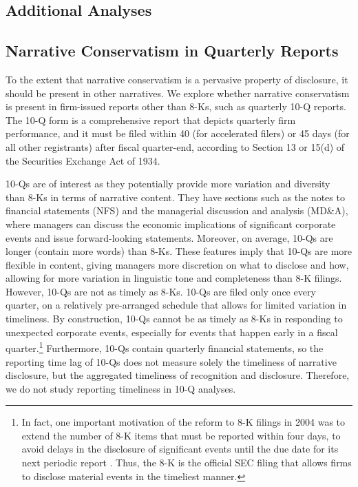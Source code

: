 \documentclass[letterpaper,12pt]{article}
\begin{document}
\begin{spacing}{1.5}
\section{Additional Analyses}
\subsection{Narrative Conservatism in Quarterly Reports}
\noindent To the extent that narrative conservatism is a pervasive property of disclosure, it should be present in other narratives. We explore whether narrative conservatism is present in firm-issued reports other than 8-Ks, such as quarterly 10-Q reports. The 10-Q form is a comprehensive report that depicts quarterly firm performance, and it must be filed within 40 (for accelerated filers) or 45 days (for all other registrants) after fiscal quarter-end, according to Section 13 or 15(d) of the Securities Exchange Act of 1934.

10-Qs are of interest as they potentially provide more variation and diversity than 8-Ks in terms of narrative content. They have sections such as the notes to financial statements (NFS) and the managerial discussion and analysis (MD\&A), where managers can discuss the economic implications of significant corporate events and issue forward-looking statements. Moreover, on average, 10-Qs are longer (contain more words) than 8-Ks. These features imply that 10-Qs are more flexible in content, giving managers more discretion on what to disclose and how, allowing for more variation in linguistic tone and completeness than 8-K filings. However, 10-Qs are not as timely as 8-Ks. 10-Qs are filed only once every quarter, on a relatively pre-arranged schedule that allows for limited variation in timeliness. By construction, 10-Qs cannot be as timely as 8-Ks in responding to unexpected corporate events, especially for events that happen early in a fiscal quarter.\footnote{In fact, one important motivation of the reform to 8-K filings in 2004 was to extend the number of 8-K items that must be reported within four days, to avoid delays in the disclosure of significant events until the due date for its next periodic report \cite{secFinalRuleAdditional2004}. Thus, the 8-K is the official SEC filing that allows firms to disclose material events in the timeliest manner.} Furthermore, 10-Qs contain quarterly financial statements, so the reporting time lag of 10-Qs does not measure solely the timeliness of narrative disclosure, but the aggregated timeliness of recognition and disclosure. Therefore, we do not study reporting timeliness in 10-Q analyses. 



\end{spacing}
\end{document}

